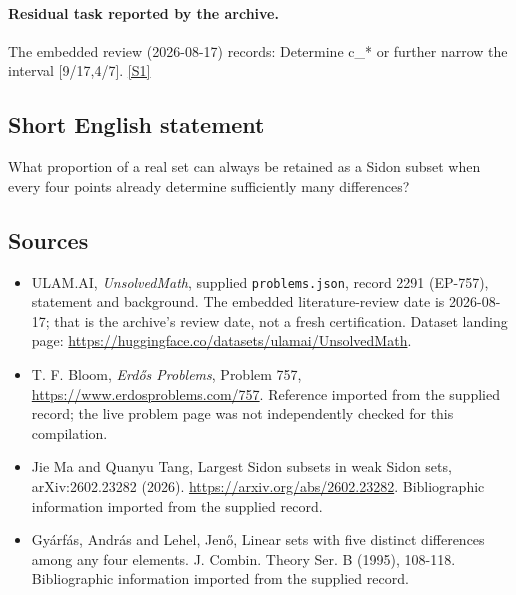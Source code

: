 \documentclass[11pt,a4paper]{article}
\newcommand{\sref}[2]{\hyperlink{source:#1:#2}{[S#2]}}
\begin{document}
\paragraph{Residual task reported by the archive.}

The embedded review (2026-08-17) records: Determine c\_* or further narrow the interval [9/17,4/7]. \sref{2291}{1}

\subsection{Short English statement}

What proportion of a real set can always be retained as a Sidon subset when every four points already determine sufficiently many differences?

\subsection{Sources}

{\small

\begin{itemize}

\item[\hypertarget{source:2291:1}{S1}] ULAM.AI, \emph{UnsolvedMath}, supplied \texttt{problems.json}, record 2291 (EP-757), statement and background. The embedded literature-review date is 2026-08-17; that is the archive’s review date, not a fresh certification. Dataset landing page: \url{https://huggingface.co/datasets/ulamai/UnsolvedMath}.

\item[\hypertarget{source:2291:2}{S2}] T. F. Bloom, \emph{Erdős Problems}, Problem 757, \url{https://www.erdosproblems.com/757}. Reference imported from the supplied record; the live problem page was not independently checked for this compilation.

\item[\hypertarget{source:2291:3}{S3}] Jie Ma and Quanyu Tang, Largest Sidon subsets in weak Sidon sets, arXiv:2602.23282 (2026). \url{https://arxiv.org/abs/2602.23282}. Bibliographic information imported from the supplied record.

\item[\hypertarget{source:2291:4}{S4}] Gy\'{a}rf\'{a}s, Andr\'{a}s and Lehel, Jen\H{o}, Linear sets with five distinct differences among any four elements. J. Combin. Theory Ser. B (1995), 108-118. Bibliographic information imported from the supplied record.

\end{itemize}

}

\label{end:2291}
\end{document}
